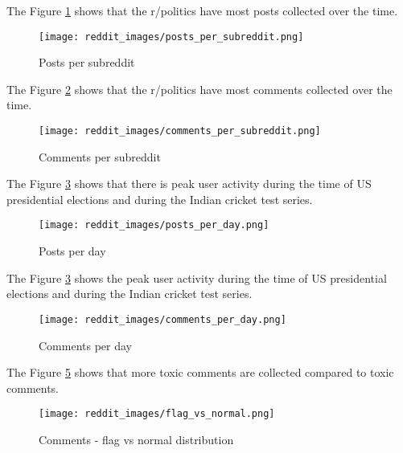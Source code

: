 \documentclass[sigconf]{acmart}
\begin{document}
The Figure \ref{fig:reddit_images/posts_per_subreddit} shows that the r/politics have most posts collected over the time.\newline
\begin{figure}[h]
    \centering
    \texttt{[image: reddit\_images/posts\_per\_subreddit.png]} %
    \caption{Posts per subreddit}
    \label{fig:reddit_images/posts_per_subreddit}
\end{figure}


The Figure \ref{fig:reddit_images/comments_per_subreddit} shows that the r/politics have most comments collected over the time.\newline
\begin{figure}[h]
    \centering
    \texttt{[image: reddit\_images/comments\_per\_subreddit.png]} %
    \caption{Comments per subreddit}
    \label{fig:reddit_images/comments_per_subreddit}
\end{figure}


The Figure \ref{fig:reddit_images/posts_per_day} shows that there is peak user activity during the time of US presidential elections and during the Indian cricket test series.\newline
\begin{figure}[h]
    \centering
    \texttt{[image: reddit\_images/posts\_per\_day.png]} %
    \caption{Posts per day}
    \label{fig:reddit_images/posts_per_day}
\end{figure}


The Figure \ref{fig:reddit_images/posts_per_day} shows the peak user activity during the time of US presidential elections and during the Indian cricket test series.\newline
\begin{figure}[h]
    \centering
    \texttt{[image: reddit\_images/comments\_per\_day.png]} %
    \caption{Comments per day}
    \label{fig:reddit_images/comments_per_day}
\end{figure}


The Figure \ref{fig:reddit_images/flag_vs_normal} shows that more toxic comments are collected compared to toxic comments.\newline
\begin{figure}[h]
    \centering
    \texttt{[image: reddit\_images/flag\_vs\_normal.png]} %
    \caption{Comments - flag vs normal distribution}
    \label{fig:reddit_images/flag_vs_normal}
\end{figure}
\end{document}
